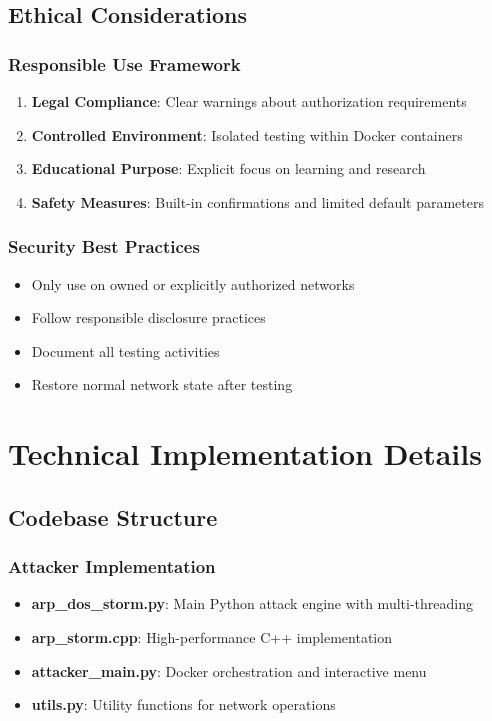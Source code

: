 \documentclass[12pt,a4paper]{article}
\begin{document}
\subsection{Ethical Considerations}

\subsubsection{Responsible Use Framework}
\begin{enumerate}
    \item \textbf{Legal Compliance}: Clear warnings about authorization requirements
    \item \textbf{Controlled Environment}: Isolated testing within Docker containers
    \item \textbf{Educational Purpose}: Explicit focus on learning and research
    \item \textbf{Safety Measures}: Built-in confirmations and limited default parameters
\end{enumerate}

\subsubsection{Security Best Practices}
\begin{itemize}
    \item Only use on owned or explicitly authorized networks
    \item Follow responsible disclosure practices
    \item Document all testing activities
    \item Restore normal network state after testing
\end{itemize}

\section{Technical Implementation Details}

\subsection{Codebase Structure}

\subsubsection{Attacker Implementation}
\begin{itemize}
    \item \textbf{arp\_dos\_storm.py}: Main Python attack engine with multi-threading
    \item \textbf{arp\_storm.cpp}: High-performance C++ implementation
    \item \textbf{attacker\_main.py}: Docker orchestration and interactive menu
    \item \textbf{utils.py}: Utility functions for network operations
\end{itemize}
\end{document}
